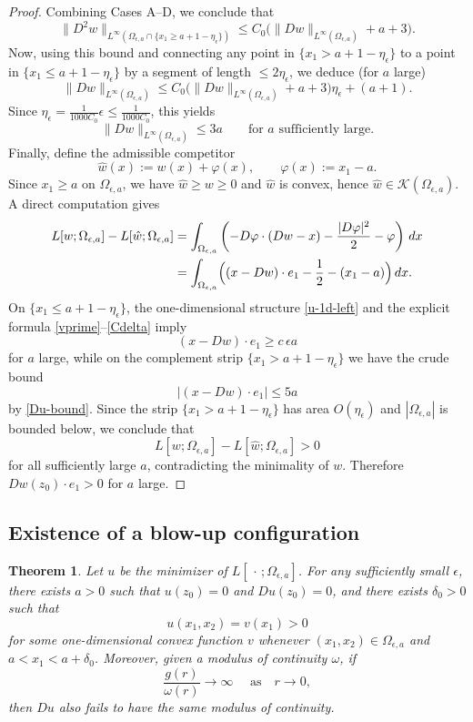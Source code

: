 \documentclass[reqno,11pt]{amsart}
\newtheorem{thm}{Theorem}[section]
\numberwithin{equation}{section}
\theoremstyle{remark}
\begin{document}
\begin{proof}
\smallskip
Combining Cases A--D, we conclude that
\[
\|D^2w\|_{L^\infty(\Omega_{\epsilon,a}\cap\{x_1\ge a+1-\eta_\epsilon\})}
\le C_0\bigl(\|Dw\|_{L^\infty(\Omega_{\epsilon,a})}+a+3\bigr).
\]
Now, using this bound and connecting any point in $\{x_1>a+1-\eta_\epsilon\}$ to a point in $\{x_1\le a+1-\eta_\epsilon\}$ by a segment of length
$\le 2\eta_\epsilon$, we deduce (for $a$ large)
\[
\|Dw\|_{L^\infty(\Omega_{\epsilon,a})}
\le C_0\bigl(\|Dw\|_{L^\infty(\Omega_{\epsilon,a})}+a+3\bigr)\eta_\epsilon + (a+1).
\]
Since $\eta_\epsilon=\frac{1}{1000C_0}\epsilon\le \frac{1}{1000C_0}$, this yields
\begin{equation}\label{Du-bound}
\|Dw\|_{L^\infty(\Omega_{\epsilon,a})}\le 3a
\qquad\text{for $a$ sufficiently large}.
\end{equation}
Finally, define the admissible competitor
\[
\hat w(x):=w(x)+\varphi(x),
\qquad \varphi(x):=x_1-a.
\]
Since $x_1\ge a$ on $\Omega_{\epsilon,a}$, we have $\hat w\ge w\ge0$ and $\hat w$ is convex, hence $\hat w\in\mathcal K(\Omega_{\epsilon,a})$.
A direct computation gives
\begin{align*}
L[w;\Omega_{\epsilon,a}]-L[\hat w;\Omega_{\epsilon,a}]
&=
\int_{\Omega_{\epsilon,a}}
\left(
- D\varphi \cdot (Dw-x)
- \frac{|D\varphi|^2}{2}
- \varphi
\right)\,dx\\
&=
\int_{\Omega_{\epsilon,a}}
\Bigl((x-Dw)\cdot e_1 -\frac12-(x_1-a)\Bigr)\,dx.
\end{align*}
On $\{x_1\le a+1-\eta_\epsilon\}$, the one-dimensional structure \eqref{u-1d-left} and the explicit formula
\eqref{vprime}--\eqref{Cdelta} imply
\[
(x-Dw)\cdot e_1\ge c\,\epsilon a
\]
for $a$ large, while on the complement strip
$\{x_1>a+1-\eta_\epsilon\}$ we have the crude bound
\[
\bigl|(x-Dw)\cdot e_1\bigr|\le 5a
\]
by \eqref{Du-bound}.
Since the strip $\{x_1>a+1-\eta_\epsilon\}$ has area $O(\eta_\epsilon)$ and $|\Omega_{\epsilon,a}|$ is bounded below,
we conclude that
\[
L[w;\Omega_{\epsilon,a}]-L[\hat w;\Omega_{\epsilon,a}]>0
\]
for all sufficiently large $a$, contradicting the minimality of $w$.
Therefore $Dw(z_0)\cdot e_1>0$ for $a$ large.
\end{proof}

\subsection{Existence of a blow-up configuration}

\begin{thm}\label{thm:counterexample}
Let $u$ be the minimizer of $L[\,\cdot\,;\Omega_{\epsilon,a}]$. For any sufficiently small $\epsilon$, there exists $a>0$ such that
$u(z_0)=0$ and $Du(z_0)=0$, and there exists $\delta_0>0$ such that
\[
u(x_1,x_2)=v(x_1)>0
\]
for some one-dimensional convex function $v$ whenever $(x_1,x_2)\in\Omega_{\epsilon,a}$ and $a<x_1<a+\delta_0$.
Moreover, given a modulus of continuity $\omega$, if
\begin{equation}
\label{eq:g omega}\frac{g(r)}{\omega(r)}\to \infty\quad \text{ as} \quad r\to 0,
\end{equation}
then $Du$ also fails to have the same modulus of continuity.
\end{thm}
\end{document}
